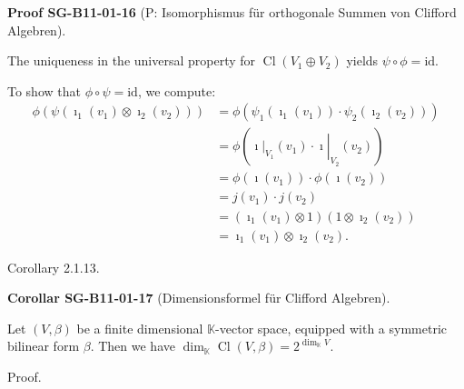 \documentclass[10pt, letterpaper]{article}
\newcommand{\CustomHeading}[3]{%
  \par\medskip\noindent%
  \textbf{#1 #2} \textnormal{(#3)}.\enskip%
}
\newenvironment{KORO}[2]{\begin{unitbox}\CustomHeading{Corollar}{#1}{#2}}{\end{unitbox}}
\newenvironment{PROOF}[2]{\begin{unitbox}\CustomHeading{Proof}{#1}{#2}}{\end{unitbox}}
\begin{document}
\begin{PROOF}{SG-B11-01-16}{P: Isomorphismus für orthogonale Summen von Clifford Algebren}
The uniqueness in the universal property for $\operatorname{Cl}\left(V_{1} \oplus V_{2}\right)$ yields $\psi \circ \phi=\mathrm{id}$.

To show that $\phi \circ \psi=\mathrm{id}$, we compute:
$$
\begin{aligned}
\phi\left(\psi\left(\imath_{1}\left(v_{1}\right) \otimes \imath_{2}\left(v_{2}\right)\right)\right) & =\phi\left(\psi_{1}\left(\imath_{1}\left(v_{1}\right)\right) \cdot \psi_{2}\left(\imath_{2}\left(v_{2}\right)\right)\right) \\
& =\phi\left(\left.\left.\imath\right|_{V_{1}}\left(v_{1}\right) \cdot \imath\right|_{V_{2}}\left(v_{2}\right)\right) \\
& =\phi\left(\imath\left(v_{1}\right)\right) \cdot \phi\left(\imath\left(v_{2}\right)\right) \\
& =j\left(v_{1}\right) \cdot j\left(v_{2}\right) \\
& =\left(\imath_{1}\left(v_{1}\right) \otimes 1\right)\left(1 \otimes \imath_{2}\left(v_{2}\right)\right) \\
& =\imath_{1}\left(v_{1}\right) \otimes \imath_{2}\left(v_{2}\right) .
\end{aligned}
$$
\end{PROOF}





Corollary 2.1.13. 

\begin{KORO}{SG-B11-01-17}{Dimensionsformel für Clifford Algebren}
Let $(V, \beta)$ be a finite dimensional $\mathbb{K}$-vector space, equipped with a symmetric bilinear form $\beta$. Then we have $\operatorname{dim}_{\mathbb{K}} \operatorname{Cl}(V, \beta)=2^{\operatorname{dim}_{\mathbb{K}} V}$.
\end{KORO}

Proof. 
\end{document}

